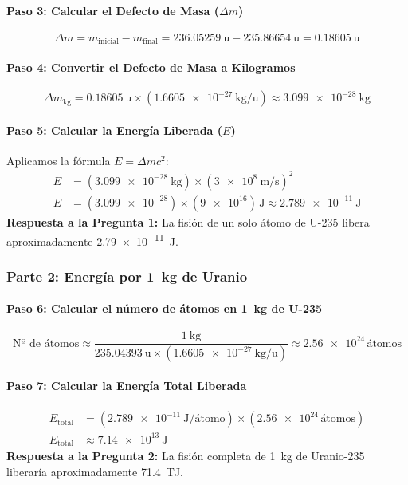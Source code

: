 \documentclass[11pt,a4paper]{article}
\begin{document}
\begin{enumerate}
\paragraph{Paso 3: Calcular el Defecto de Masa ($\Delta m$)}
\[ \Delta m = m_{\text{inicial}} - m_{\text{final}} = \SI{236.05259}{\atomicmassunit} - \SI{235.86654}{\atomicmassunit} = \SI{0.18605}{\atomicmassunit} \]

\paragraph{Paso 4: Convertir el Defecto de Masa a Kilogramos}
\[ \Delta m_{\text{kg}} = \SI{0.18605}{\atomicmassunit} \times (\SI{1.6605e-27}{\kilo\gram\per\atomicmassunit}) \approx \SI{3.099e-28}{\kilo\gram} \]

\paragraph{Paso 5: Calcular la Energía Liberada ($E$)}
Aplicamos la fórmula $E = \Delta m c^2$:
\begin{align*}
    E &= (\SI{3.099e-28}{\kilo\gram}) \times (\SI{3e8}{\meter\per\second})^2 \\
    E &= (\SI{3.099e-28}) \times (\SI{9e16}) \, \si{\joule} \approx \SI{2.789e-11}{\joule}
\end{align*}
\textbf{Respuesta a la Pregunta 1:} La fisión de un solo átomo de U-235 libera aproximadamente \SI{2.79e-11}{\joule}.

\subsubsection*{Parte 2: Energía por \SI{1}{\kilo\gram} de Uranio}

\paragraph{Paso 6: Calcular el número de átomos en \SI{1}{\kilo\gram} de U-235}
\[ \text{Nº de átomos} \approx \frac{\SI{1}{\kilo\gram}}{\SI{235.04393}{\atomicmassunit} \times (\SI{1.6605e-27}{\kilo\gram\per\atomicmassunit})} \approx \num{2.56e24} \, \text{átomos} \]

\paragraph{Paso 7: Calcular la Energía Total Liberada}
\begin{align*}
    E_{\text{total}} &= (\SI{2.789e-11}{\joule\per\text{átomo}}) \times (\num{2.56e24} \, \text{átomos}) \\
    E_{\text{total}} &\approx \SI{7.14e13}{\joule}
\end{align*}
\textbf{Respuesta a la Pregunta 2:} La fisión completa de \SI{1}{\kilo\gram} de Uranio-235 liberaría aproximadamente \SI{71.4}{\tera\joule}.


\end{enumerate}
\end{document}
